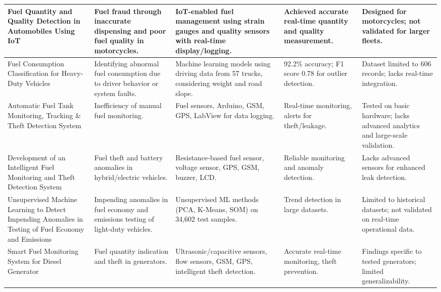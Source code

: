 \begin{SingleSpace}
\begin{longtable}{|p{}|p{}|p{}|p{}|p{}|}
Fuel Quantity and Quality Detection in Automobiles Using IoT \cite{rs2024fuel} &
Fuel fraud through inaccurate dispensing and poor fuel quality in motorcycles. &
IoT-enabled fuel management using strain gauges and quality sensors with real-time display/logging. &
Achieved accurate real-time quantity and quality measurement. &
Designed for motorcycles; not validated for larger fleets. \\
\hline

Fuel Consumption Classification for Heavy-Duty Vehicles \cite{mumcuoglu2023fuel} &
Identifying abnormal fuel consumption due to driver behavior or system faults. &
Machine learning models using driving data from 57 trucks, considering weight and road slope. &
92.2\% accuracy; F1 score 0.78 for outlier detection. &
Dataset limited to 606 records; lacks real-time integration. \\
\hline

Automatic Fuel Tank Monitoring, Tracking \& Theft Detection System \cite{komal2018automatic} &
Inefficiency of manual fuel monitoring. &
Fuel sensors, Arduino, GSM, GPS, LabView for data logging. &
Real-time monitoring, alerts for theft/leakage. &
Tested on basic hardware; lacks advanced analytics and large-scale validation. \\
\hline

Development of an Intelligent Fuel Monitoring and Theft Detection System \cite{mathi2024development} &
Fuel theft and battery anomalies in hybrid/electric vehicles. &
Resistance-based fuel sensor, voltage sensor, GPS, GSM, buzzer, LCD. &
Reliable monitoring and anomaly detection. &
Lacks advanced sensors for enhanced leak detection. \\
\hline

Unsupervised Machine Learning to Detect Impending Anomalies in Testing of Fuel Economy and Emissions \cite{fortela2023unsupervised} &
Impending anomalies in fuel economy and emissions testing of light-duty vehicles. &
Unsupervised ML\glsadd{ML} methods (PCA, K-Means, SOM\glsadd{SOM}) on 34,602 test samples. &
Trend detection in large datasets. &
Limited to historical datasets; not validated on real-time operational data. \\
\hline

Smart Fuel Monitoring System for Diesel Generator \cite{tatababu2024smart} &
Fuel quantity indication and theft in generators. &
Ultrasonic/capacitive sensors, flow sensors, GSM, GPS, intelligent theft detection. &
Accurate real-time monitoring, theft prevention. &
Findings specific to tested generators; limited generalizability. \\
\hline


\end{longtable}
\end{SingleSpace}
